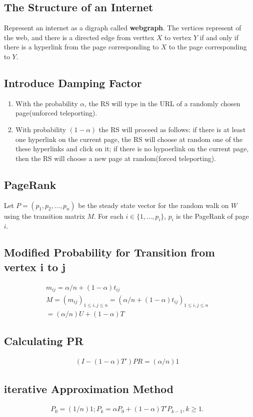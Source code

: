 \documentclass{article}
\begin{document}
\begin{spacing}{1.5}
\subsection{The Structure of an Internet}
Represent an internet as a digraph called \textbf{webgraph}. The vertices represent of the web, and there is a directed edge from verttex $X$ to vertex $Y$ if and only if there is a hyperlink from the page corresponding to $X$ to the page corresponding to $Y$. 
\subsection{Introduce Damping Factor}
\begin{enumerate}
    \item With the probability $\alpha$, the RS will type in the URL of a randomly chosen page(unforced teleporting).
    \item With probability $(1-\alpha)$ the RS will proceed as follows: if there is at least one hyperlink on the current page, the RS will choose at random one of the these hyperlinks and click on it; if there is no hypoerlink on the current page, then the RS will choose a new page at random(forced teleporting).
\end{enumerate}
\subsection{PageRank}
Let $P = (p_1,p_2,\dots,p_n)$ be the steady state vector for the random walk on $W$ using the transition matrix $M$. For each $i \in \{1,\dots,p_i\}$, $p_i$ is the PageRank of page $i$. 
\subsection{Modified Probability for Transition from vertex i to j}
\begin{align}
        m_{ij} = \alpha/n + (1-\alpha)t_{ij}\\
        M = (m_{ij})_{1 \le i,j \le n} = (\alpha/n+(1-\alpha)t_{ij})_{1 \le i,j \le n}\\
        = (\alpha/n)U +(1-\alpha)T
\end{align}
\subsection{Calculating PR}
\begin{align}
    (I-(1-\alpha)T')PR = (\alpha/n)1
\end{align}
\subsection{iterative Approximation Method}
\begin{align}
    P_0 = (1/n)1; P_k =\alpha P_0+(1-\alpha)T'P_{k-1}, k \ge1.
\end{align}


\end{spacing}
\end{document}
